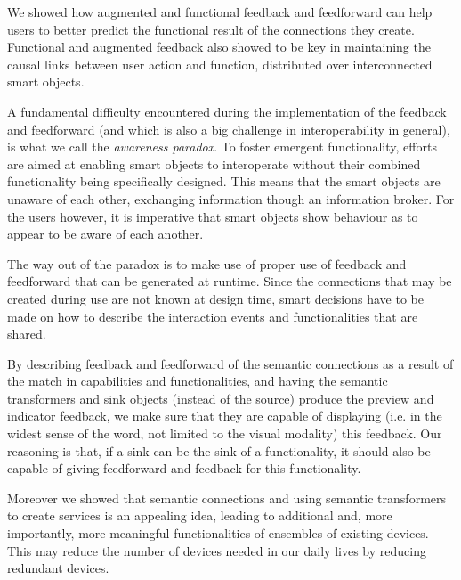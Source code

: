 We showed how augmented and functional feedback and feedforward can help users to better predict the functional result of the connections they create. Functional and augmented feedback also showed to be key in maintaining the causal links between user action and function, distributed over interconnected smart objects.

A fundamental difficulty encountered during the implementation of the feedback and feedforward (and which is also a big challenge in interoperability in general), is what we call the \emph{awareness paradox}. To foster emergent functionality, efforts are aimed at enabling smart objects to interoperate without their combined functionality being specifically designed. This means that the smart objects are unaware of each other, exchanging information though an information broker. For the users however, it is imperative that smart objects show behaviour as to appear to be aware of each another. 

The way out of the paradox is to make use of proper use of feedback and feedforward that can be generated  at runtime. Since the connections that may be created during use are not known at design time, smart decisions have to be made on how to describe the interaction events and functionalities that are shared. 

By describing feedback and feedforward of the semantic connections as a result of the match in capabilities and functionalities, and having the semantic transformers and sink objects (instead of the source) produce the preview and indicator feedback, we make sure that they are capable of displaying (i.e. in the widest sense of the word, not limited to the visual modality) this feedback. Our reasoning is that, if a sink can be the sink of a functionality, it should also be capable of giving feedforward and feedback for this functionality.


Moreover we showed that semantic connections and using semantic transformers to create services is an appealing idea, leading to additional and, more importantly, more meaningful functionalities of ensembles of existing devices. This may reduce the number of devices needed in our daily lives by reducing redundant devices.


